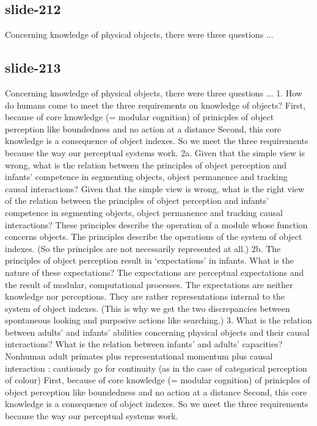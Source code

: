 \documentclass[12pt,\papersize]{extarticle}
\begin{document}
 
\subsection{slide-212}
Concerning knowledge of physical objects, there were three questions ...
 
 
\subsection{slide-213}
Concerning knowledge of physical objects, there were three questions ...
1. How do humans come to meet the three requirements on knowledge of objects? First, because of core knowledge (= modular cognition) of prinicples of object perception like boundedness and no action at a distance Second, this core knowledge is a consequence of object indexes. So we meet the three requirements because the way our perceptual systems work. 2a. Given that the simple view is wrong, what is the relation between the principles of object perception and infants’ competence in segmenting objects, object permanence and tracking causal interactions? Given that the simple view is wrong, what is the right view of the relation between the principles of object perception and infants' competence in segmenting objects, object permanence and tracking causal interactions? These principles describe the operation of a module whose function concerns objects. The principles describe the operations of the system of object indexes. (So the principles are not necessarily represented at all.) 2b. The principles of object perception result in ‘expectations’ in infants. What is the nature of these expectations? The expectations are perceptual expectations and the result of modular, computational processes. The expectations are neither knowledge nor perceptions. They are rather representations internal to the system of object indexes. (This is why we get the two discrepancies between spontaneous looking and purposive actions like searching.) 3. What is the relation between adults’ and infants’ abilities concerning physical objects and their causal interactions? What is the relation between infants' and adults' capacities? Nonhuman adult primates plus representational momentum plus causal interaction : cautiously go for continuity (as in the case of categorical perception of colour)
First, because of core knowledge (= modular cognition) of prinicples of object perception like boundedness and no action at a distance
Second, this core knowledge is a consequence of object indexes.
So we meet the three requirements because the way our perceptual systems work.
 
\end{document}
